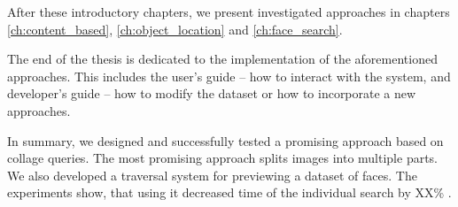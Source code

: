 After these introductory chapters, we present investigated approaches in chapters \ref{ch:content_based}, \ref{ch:object_location} and \ref{ch:face_search}. 

The end of the thesis is dedicated to the implementation of the aforementioned approaches. This includes the user's guide -- how to interact with the system, and developer's guide -- how to modify the dataset or how to incorporate a new approaches.

\bigskip

In summary, we designed and successfully tested a promising approach based on collage queries. The most promising approach splits images into multiple parts. We also developed a traversal system for previewing a dataset of faces. The experiments show, that using it decreased time of the individual search by XX\% \todo{}.